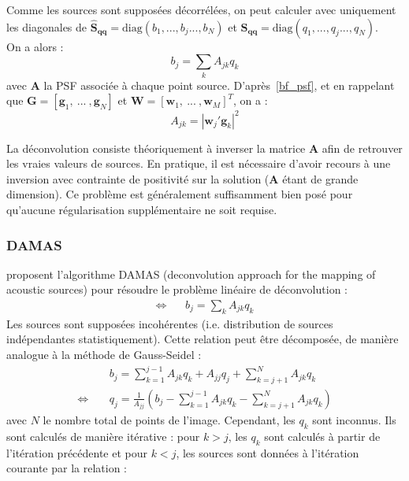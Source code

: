 Comme les sources sont supposées décorrélées, on peut calculer avec uniquement les diagonales de  $\bm{\hat{S}_{qq}}=\text{diag}(b_1, ... , b_j...,b_N)$ et $\bm{S_{qq}}=\text{diag}(q_1, ... , q_j...,q_N)$.\\

On a alors : 
\begin{equation}
	b_j = \sum_k A_{jk}q_k
\end{equation}
avec  $\bm{A}$ la PSF associée à chaque point source. D'après~\ref{bf_psf}, et en rappelant que $\bm{G}=[\bm{g}_1,~...~,\bm{g}_N]$ et $\bm{W}=[\bm{w}_1,~...~,\bm{w}_M]^T$, on a : 
\begin{equation}
	A_{jk}=|\bm{w}_j'\bm{g}_k|^2
\end{equation}

La déconvolution consiste théoriquement à inverser la matrice $\bm{A}$ afin de retrouver les vraies valeurs de sources. En pratique, il est nécessaire d'avoir recours à une inversion avec contrainte de positivité sur la solution ($\bm{A}$ étant de grande dimension). Ce problème est généralement suffisamment bien posé pour qu'aucune régularisation supplémentaire ne soit requise.



\subsubsection{DAMAS}
 \cite{Brooks2006} proposent l'algorithme DAMAS (deconvolution approach for the mapping of acoustic sources) pour résoudre le problème linéaire de déconvolution : 
\begin{align}
	\Leftrightarrow~~~~ & b_j=\sum_k A_{jk}q_k
\end{align}
Les sources sont supposées incohérentes (i.e. distribution de sources indépendantes statistiquement).
Cette relation peut être décomposée, de manière analogue à la méthode de Gauss-Seidel : 
\begin{align}
	&b_j= \sum_{k=1}^{j-1}A_{jk}q_k + A_{jj}q_j + \sum_{k=j+1}^{N}A_{jk}q_k\\
	\Leftrightarrow~~~~~& q_j = \frac{1}{A_{jj}}\left( b_j - \sum_{k=1}^{j-1}A_{jk}q_k -  \sum_{k=j+1}^{N}A_{jk}q_k   \right)
\end{align}
avec $N$ le nombre total de points de l'image.
Cependant, les $q_k$ sont inconnus. Ils sont calculés de manière itérative : pour $k>j$, les $q_k$ sont calculés à partir de l'itération précédente et pour $k<j$, les sources sont données à l'itération courante par la relation : 

